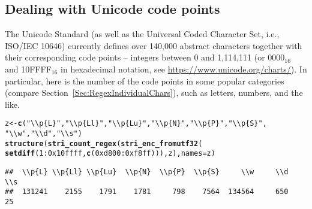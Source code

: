 \documentclass[nojss]{jss}\usepackage[]{graphicx}\usepackage[]{xcolor}
\makeatletter
\newcommand{\hlnum}[1]{\textcolor[rgb]{0.686,0.059,0.569}{#1}}%
\newcommand{\hlstr}[1]{\textcolor[rgb]{0.192,0.494,0.8}{#1}}%
\newcommand{\hlopt}[1]{\textcolor[rgb]{0,0,0}{#1}}%
\newcommand{\hlstd}[1]{\textcolor[rgb]{0.345,0.345,0.345}{#1}}%
\newcommand{\hlkwb}[1]{\textcolor[rgb]{0.69,0.353,0.396}{#1}}%
\newcommand{\hlkwc}[1]{\textcolor[rgb]{0.333,0.667,0.333}{#1}}%
\newcommand{\hlkwd}[1]{\textcolor[rgb]{0.737,0.353,0.396}{\textbf{#1}}}%
\newenvironment{kframe}{%
 \def\at@end@of@kframe{}%
 \ifinner\ifhmode%
  \def\at@end@of@kframe{\end{minipage}}%
  \begin{minipage}{\columnwidth}%
 \fi\fi%
 \def\FrameCommand##1{\hskip\@totalleftmargin \hskip-\fboxsep
 \colorbox{shadecolor}{##1}\hskip-\fboxsep
     \hskip-\linewidth \hskip-\@totalleftmargin \hskip\columnwidth}%
 \MakeFramed {\advance\hsize-\width
   \@totalleftmargin\z@ \linewidth\hsize
   \@setminipage}}%
 {\par\unskip\endMakeFramed%
 \at@end@of@kframe}
\newenvironment{knitrout}{}{} %
\makeatother
\begin{document}
\subsection{Dealing with Unicode code points}\label{Sec:codepoints}

The Unicode Standard (as well as the
Universal Coded Character Set, i.e., ISO/IEC 10646)
currently defines over 140{,}000 abstract characters together with
their corresponding code points -- integers
between 0 and 1{,}114{,}111 (or 0000${}_{16}$ and 10FFFF${}_{16}$
in hexadecimal notation, see \url{https://www.unicode.org/charts/}).
In particular, here is the number of the code points in
some popular categories (compare Section~\ref{Sec:RegexIndividualChars}),
such as letters, numbers, and the like.

\begin{knitrout}
\color{fgcolor}\begin{kframe}
\begin{alltt}
\hlstd{z} \hlkwb{<-} \hlkwd{c}\hlstd{(}\hlstr{"\textbackslash{}\textbackslash{}p\{L\}"}\hlstd{,} \hlstr{"\textbackslash{}\textbackslash{}p\{Ll\}"}\hlstd{,} \hlstr{"\textbackslash{}\textbackslash{}p\{Lu\}"}\hlstd{,} \hlstr{"\textbackslash{}\textbackslash{}p\{N\}"}\hlstd{,} \hlstr{"\textbackslash{}\textbackslash{}p\{P\}"}\hlstd{,} \hlstr{"\textbackslash{}\textbackslash{}p\{S\}"}\hlstd{,}
  \hlstr{"\textbackslash{}\textbackslash{}w"}\hlstd{,} \hlstr{"\textbackslash{}\textbackslash{}d"}\hlstd{,} \hlstr{"\textbackslash{}\textbackslash{}s"}\hlstd{)}
\hlkwd{structure}\hlstd{(}\hlkwd{stri_count_regex}\hlstd{(}\hlkwd{stri_enc_fromutf32}\hlstd{(}
  \hlkwd{setdiff}\hlstd{(}\hlnum{1}\hlopt{:}\hlnum{0x10ffff}\hlstd{,} \hlkwd{c}\hlstd{(}\hlnum{0xd800}\hlopt{:}\hlnum{0xf8ff}\hlstd{))), z),} \hlkwc{names}\hlstd{=z)}
\end{alltt}
\begin{verbatim}
##  \\p{L} \\p{Ll} \\p{Lu}  \\p{N}  \\p{P}  \\p{S}     \\w     \\d     \\s 
##  131241    2155    1791    1781     798    7564  134564     650      25
\end{verbatim}
\end{kframe}
\end{knitrout}
\end{document}
